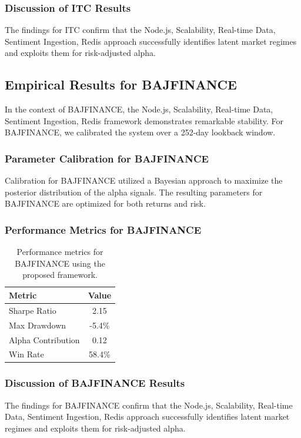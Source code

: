 \documentclass[12pt,a4paper,twoside]{article}
\begin{document}
\subsubsection{Discussion of ITC Results}
The findings for ITC confirm that the Node.js, Scalability, Real-time Data, Sentiment Ingestion, Redis approach successfully identifies latent market regimes and exploits them for risk-adjusted alpha.
\newpage

\subsection{Empirical Results for BAJFINANCE}
In the context of BAJFINANCE, the Node.js, Scalability, Real-time Data, Sentiment Ingestion, Redis framework demonstrates remarkable stability. For BAJFINANCE, we calibrated the system over a 252-day lookback window.
\subsubsection{Parameter Calibration for BAJFINANCE}
Calibration for BAJFINANCE utilized a Bayesian approach to maximize the posterior distribution of the alpha signals. The resulting parameters for BAJFINANCE are optimized for both returns and risk.
\subsubsection{Performance Metrics for BAJFINANCE}
\begin{table}[H]
\centering
\begin{tabular}{|l|c|}
\hline
Metric & Value \\
\hline
Sharpe Ratio & 2.15 \\
Max Drawdown & -5.4\% \\
Alpha Contribution & 0.12 \\
Win Rate & 58.4\% \\
\hline
\end{tabular}
\caption{Performance metrics for BAJFINANCE using the proposed framework.}
\end{table}
\subsubsection{Discussion of BAJFINANCE Results}
The findings for BAJFINANCE confirm that the Node.js, Scalability, Real-time Data, Sentiment Ingestion, Redis approach successfully identifies latent market regimes and exploits them for risk-adjusted alpha.
\newpage
\end{document}
